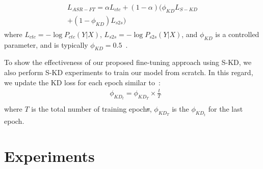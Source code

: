 \documentclass{article}
\begin{document}
\begin{align}
\begin{split}
L_{ASR-FT}=\alpha L_{ctc} +(1-\alpha) (\phi_{KD} L_{S-KD} \\ +(1-\phi_{KD})L_{s2s})
\end{split}
\end{align}
where $L_{ctc}=-\log P_{ctc}(Y|X)$, $L_{s2s}=-\log P_{s2s}(Y|X)$, and $\phi_{KD}$ is a controlled parameter, and is typically $\phi_{KD}=0.5$~\citep{sony}. 


To show the effectiveness of our proposed fine-tuning approach using  S-KD, we also perform S-KD experiments to train our model from scratch. In this regard, we update the KD loss for each epoch similar to~\citep{selfkdgeneralization}:
\begin{equation}
\begin{split}
   & \phi_{KD_t} = \phi_{KD_T} \times \frac{t}{T} \\
\end{split}
\end{equation}
where $T$ is the total number of training epoch\sout{s}, $\phi_{KD_T}$ is the $\phi_{KD_t}$ for the last epoch. 

\section{Experiments}
\label{sec:experiments}
\end{document}
